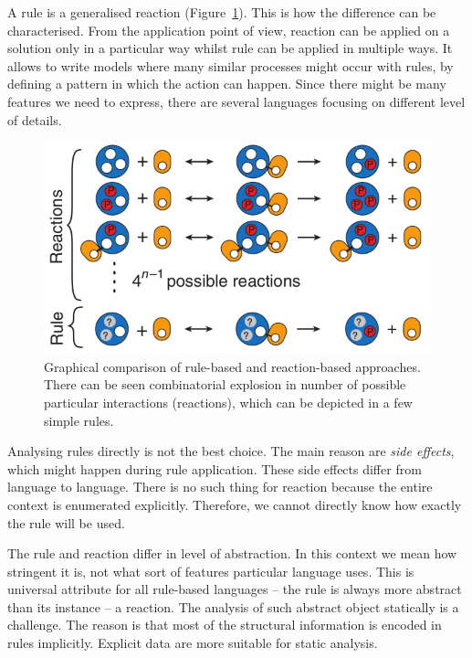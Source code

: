 \documentclass[12pt]{fithesis2}
\begin{document}
A rule is a generalised reaction (Figure~\ref{reaction_vs_rule}). This is how the difference can be characterised. From the application point of view, reaction can be applied on a solution only in a particular way whilst rule can be applied in multiple ways. It allows to write models where many similar processes might occur with rules, by defining a pattern in which the action can happen. Since there might be many features we need to express, there are several languages focusing on different level of details.

\begin{figure}[!h]
\begin{center}
\includegraphics[scale=0.5]{pics/reaction_vs_rule}
\end{center}
\caption{Graphical comparison of rule-based and reaction-based approaches. There can be seen combinatorial explosion in number of possible particular interactions (reactions), which can be depicted in a few simple rules.}\label{reaction_vs_rule}
\end{figure}

Analysing rules directly is not the best choice. The main reason are \emph{side effects}, which might happen during rule application. These side effects differ from language to language. There is no such thing for reaction because the entire context is enumerated explicitly. Therefore, we cannot directly know how exactly the rule will be used.

The rule and reaction differ in level of abstraction. In this context we mean how stringent it is, not what sort of features particular language uses. This is universal attribute for all rule-based languages -- the rule is always more abstract than its instance -- a reaction. The analysis of such abstract object statically is a challenge. The reason is that most of the structural information is encoded in rules implicitly. Explicit data are more suitable for static analysis.
\end{document}
